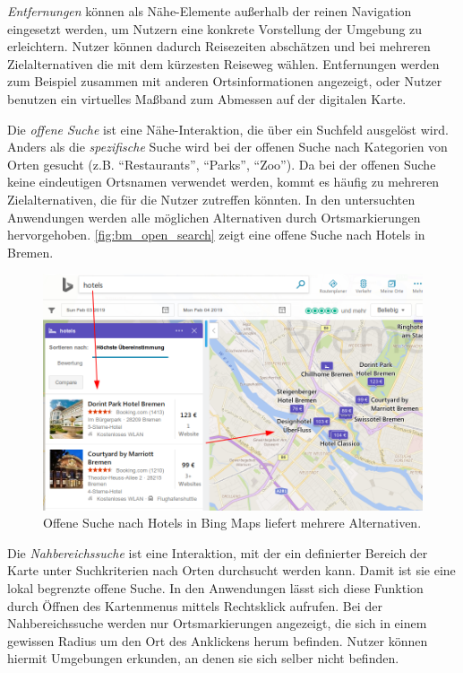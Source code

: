 \emph{Entfernungen} können als Nähe-Elemente außerhalb der reinen Navigation eingesetzt werden, um Nutzern eine konkrete Vorstellung der Umgebung zu erleichtern.
Nutzer können dadurch Reisezeiten abschätzen und bei mehreren Zielalternativen die mit dem kürzesten Reiseweg wählen.
Entfernungen werden zum Beispiel zusammen mit anderen Ortsinformationen angezeigt, oder Nutzer benutzen ein virtuelles Maßband zum Abmessen auf der digitalen Karte.

Die \emph{offene Suche} ist eine Nähe-Interaktion, die über ein Suchfeld ausgelöst wird.
Anders als die \emph{spezifische} Suche wird bei der offenen Suche nach Kategorien von Orten gesucht (z.B. \enquote{Restaurants}, \enquote{Parks}, \enquote{Zoo}).
Da bei der offenen Suche keine eindeutigen Ortsnamen verwendet werden, kommt es häufig zu mehreren Zielalternativen, die für die Nutzer zutreffen könnten.
In den untersuchten Anwendungen werden alle möglichen Alternativen durch Ortsmarkierungen hervorgehoben.
\autoref{fig:bm_open_search} zeigt eine offene Suche nach Hotels in Bremen.
\begin{figure}[h]
	\includegraphics[width=\linewidth]{figures/map-app_examples/bm_open_search_2}
	\caption{Offene Suche nach Hotels in Bing Maps liefert mehrere Alternativen.}
	\label{fig:bm_open_search}
\end{figure}

Die \emph{Nahbereichssuche} ist eine Interaktion, mit der ein definierter Bereich der Karte unter Suchkriterien nach Orten durchsucht werden kann.
Damit ist sie eine lokal begrenzte offene Suche.
In den Anwendungen lässt sich diese Funktion durch Öffnen des Kartenmenus mittels Rechtsklick aufrufen.
Bei der Nahbereichssuche werden nur Ortsmarkierungen angezeigt, die sich in einem gewissen Radius um den Ort des Anklickens herum befinden.
Nutzer können hiermit Umgebungen erkunden, an denen sie sich selber nicht befinden.

